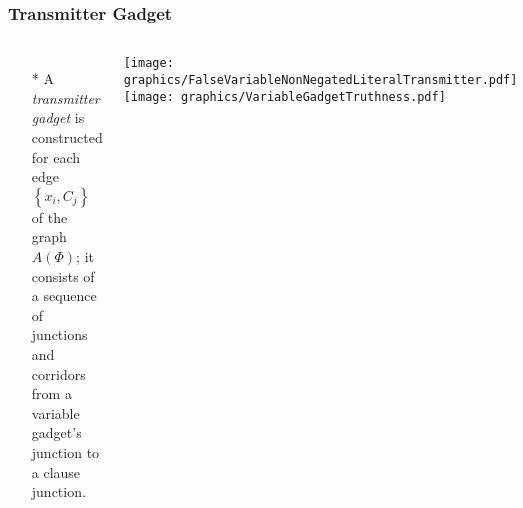 \documentclass{beamer}
\begin{document}
\begin{frame} \frametitle{Transmitter Gadget}
    \begin{columns}[c]
        \begin{itemize}
            \item[*] A {\it transmitter gadget} is constructed for each edge $\left\lbrace x_i,C_j\right\rbrace$ of the graph $A(\Phi)$; it consists of a sequence of junctions and corridors from a variable gadget's junction to a clause junction.  
        \end{itemize}
        \begin{minipage}{\linewidth}
            \begin{center}
            \texttt{[image: graphics/FalseVariableNonNegatedLiteralTransmitter.pdf]}
            \label{gfx:FalseVariableNonNegatedLiteralTransmitter.pdf}
            \texttt{[image: graphics/VariableGadgetTruthness.pdf]}
            \label{gfx:VariableGadgetTruthness.pdf}
            \end{center}
        \end{minipage}
    \end{columns}
\end{frame}

\end{document}
